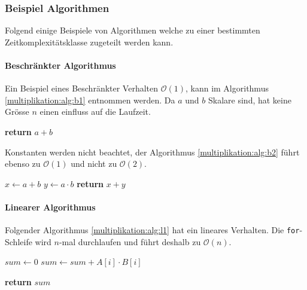 \subsubsection{Beispiel Algorithmen}

Folgend einige Beispiele von Algorithmen welche zu einer bestimmten Zeitkomplexit\"atsklasse zugeteilt werden kann.
\paragraph{Beschr\"ankter Algorithmus}

Ein Beispiel eines Beschr\"ankter Verhalten $\mathcal{O}(1)$, kann im Algorithmus \ref{multiplikation:alg:b1} entnommen werden. Da $a$ und $b$ Skalare sind, hat keine Gr\"osse $n$ einen einfluss auf die Laufzeit.

\begin{algorithm}\caption{}
	\label{multiplikation:alg:b1}
	\setlength{\lineskip}{7pt}
	\begin{algorithmic}
		\State \textbf{return} $a+b$
		\EndFunction
	\end{algorithmic}
\end{algorithm}

Konstanten werden nicht beachtet, der Algorithmus \ref{multiplikation:alg:b2} f\"uhrt ebenso zu  $\mathcal{O}(1)$ und nicht zu $\mathcal{O}(2)$.

\begin{algorithm}\caption{}
	\label{multiplikation:alg:b2}
	\setlength{\lineskip}{7pt}
	\begin{algorithmic}
		\Function{B2}{$a, b$}
		\State $ x \gets a+b $
		\State $ y \gets a \cdot b $
		\State \textbf{return} $x+y$
		\EndFunction
	\end{algorithmic}
\end{algorithm}

\paragraph{Linearer Algorithmus}

Folgender Algorithmus \ref{multiplikation:alg:l1} hat ein lineares Verhalten.
Die \texttt{for}-Schleife wird $n$-mal durchlaufen und f\"uhrt deshalb zu $\mathcal{O}(n)$.

\begin{algorithm}\caption{}
	\setlength{\lineskip}{7pt}
	\begin{algorithmic}
		\label{multiplikation:alg:l1}
		\Function{L}{$\mathbf{a}, \mathbf{b}$,n}
		\State $ sum \gets 0$
		\For{$i = 0,1,2 \dots,n$}
		\State $ sum \gets sum + A[i] \cdot B[i] $
		\EndFor
		
		\State \textbf{return} $sum$
		
		\EndFunction
	\end{algorithmic}
\end{algorithm}

